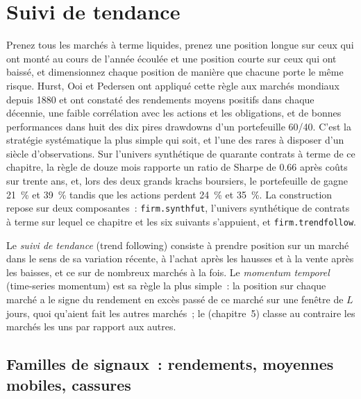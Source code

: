 \chapter{Suivi de tendance}\label{ch:s1:trend-following}

Prenez tous les marchés à terme liquides, prenez une position longue sur ceux qui ont monté au cours de l'année écoulée et une position courte sur ceux qui ont baissé, et dimensionnez chaque position de manière que chacune
porte le même risque. Hurst, Ooi et Pedersen ont appliqué cette règle aux marchés mondiaux depuis 1880 et ont constaté des rendements moyens positifs dans chaque décennie, une faible corrélation
avec les actions et les obligations, et de bonnes performances dans huit des dix pires drawdowns d'un portefeuille 60/40. C'est la stratégie systématique la plus simple qui soit,
et l'une des rares à disposer d'un siècle d'observations. Sur l'univers synthétique de quarante contrats à terme de ce chapitre, la règle de douze mois rapporte un ratio de Sharpe
de 0.66 après coûts sur trente ans, et, lors des deux grands krachs boursiers, le portefeuille de  gagne 21~\% et 39~\% tandis que les actions perdent 24~\% et 35~\%. La construction
repose sur deux composantes~: \texttt{firm.synthfut}, l'univers synthétique de contrats à terme sur lequel ce chapitre et les six suivants s'appuient, et \texttt{firm.trendfollow}.

\begin{definition}\label{def:s1:trend-following:trend}
Le \emph{suivi de tendance} (trend following) consiste à prendre position sur un marché dans le sens de sa variation récente, à l'achat après les hausses et à la vente après
les baisses, et ce sur de nombreux marchés à la fois. Le \emph{momentum temporel} (time-series momentum) est sa règle la plus simple~: la position sur chaque marché a
le signe du rendement en excès passé de ce marché sur une fenêtre de $L$ jours, quoi qu'aient fait les autres marchés~; le  (chapitre~5) classe au contraire
les marchés les uns par rapport aux autres.
\end{definition}

\section{Familles de signaux~: rendements, moyennes mobiles, cassures}


